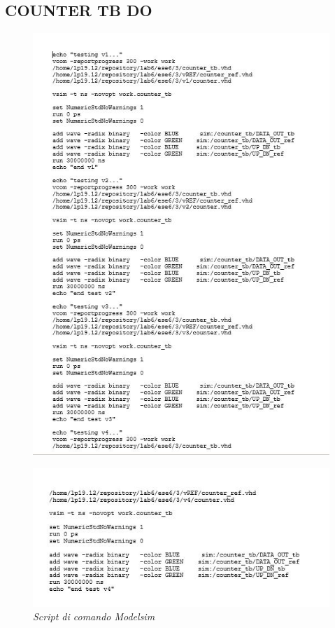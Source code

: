\subsection{COUNTER TB DO}
\begin{figure}[!htb]
	\centering
	\includegraphics[scale=1]{immagini/counterdo1}
	\label{counterdo1}
\end{figure}
\begin{figure}[!htb]
	\centering
	\includegraphics[scale=1]{immagini/counterdo2}
	\caption{\textit{Script di comando Modelsim}}
	\label{counterdo2}
\end{figure}
\newpage
\newpage
